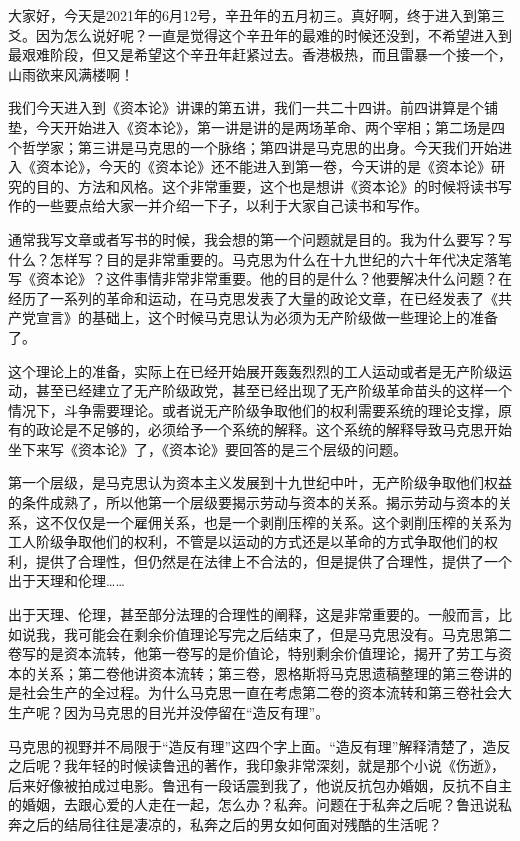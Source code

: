 \documentclass[UTF8, 12pt, a4paper]{ctexrep}
\begin{document}
大家好，今天是2021年的6月12号，辛丑年的五月初三。真好啊，终于进入到第三爻。因为怎么说好呢？一直是觉得这个辛丑年的最难的时候还没到，不希望进入到最艰难阶段，但又是希望这个辛丑年赶紧过去。香港极热，而且雷暴一个接一个，山雨欲来风满楼啊！

我们今天进入到《资本论》讲课的第五讲，我们一共二十四讲。前四讲算是个铺垫，今天开始进入《资本论》，第一讲是讲的是两场革命、两个宰相；第二场是四个哲学家；第三讲是马克思的一个脉络；第四讲是马克思的出身。今天我们开始进入《资本论》，今天的《资本论》还不能进入到第一卷，今天讲的是《资本论》研究的目的、方法和风格。这个非常重要，这个也是想讲《资本论》的时候将读书写作的一些要点给大家一并介绍一下子，以利于大家自己读书和写作。

通常我写文章或者写书的时候，我会想的第一个问题就是目的。我为什么要写？写什么？怎样写？目的是非常重要的。马克思为什么在十九世纪的六十年代决定落笔写《资本论》？这件事情非常非常重要。他的目的是什么？他要解决什么问题？在经历了一系列的革命和运动，在马克思发表了大量的政论文章，在已经发表了《共产党宣言》的基础上，这个时候马克思认为必须为无产阶级做一些理论上的准备了。

这个理论上的准备，实际上在已经开始展开轰轰烈烈的工人运动或者是无产阶级运动，甚至已经建立了无产阶级政党，甚至已经出现了无产阶级革命苗头的这样一个情况下，斗争需要理论。或者说无产阶级争取他们的权利需要系统的理论支撑，原有的政论是不足够的，必须给予一个系统的解释。这个系统的解释导致马克思开始坐下来写《资本论》了，《资本论》要回答的是三个层级的问题。

第一个层级，是马克思认为资本主义发展到十九世纪中叶，无产阶级争取他们权益的条件成熟了，所以他第一个层级要揭示劳动与资本的关系。揭示劳动与资本的关系，这不仅仅是一个雇佣关系，也是一个剥削压榨的关系。这个剥削压榨的关系为工人阶级争取他们的权利，不管是以运动的方式还是以革命的方式争取他们的权利，提供了合理性，但仍然是在法律上不合法的，但是提供了合理性，提供了一个出于天理和伦理……

出于天理、伦理，甚至部分法理的合理性的阐释，这是非常重要的。一般而言，比如说我，我可能会在剩余价值理论写完之后结束了，但是马克思没有。马克思第二卷写的是资本流转，他第一卷写的是价值论，特别剩余价值理论，揭开了劳工与资本的关系；第二卷他讲资本流转；第三卷，恩格斯将马克思遗稿整理的第三卷讲的是社会生产的全过程。为什么马克思一直在考虑第二卷的资本流转和第三卷社会大生产呢？因为马克思的目光并没停留在“造反有理”。

马克思的视野并不局限于“造反有理”这四个字上面。“造反有理”解释清楚了，造反之后呢？我年轻的时候读鲁迅的著作，我印象非常深刻，就是那个小说《伤逝》，后来好像被拍成过电影。鲁迅有一段话震到我了，他说反抗包办婚姻，反抗不自主的婚姻，去跟心爱的人走在一起，怎么办？私奔。问题在于私奔之后呢？鲁迅说私奔之后的结局往往是凄凉的，私奔之后的男女如何面对残酷的生活呢？
\end{document}
